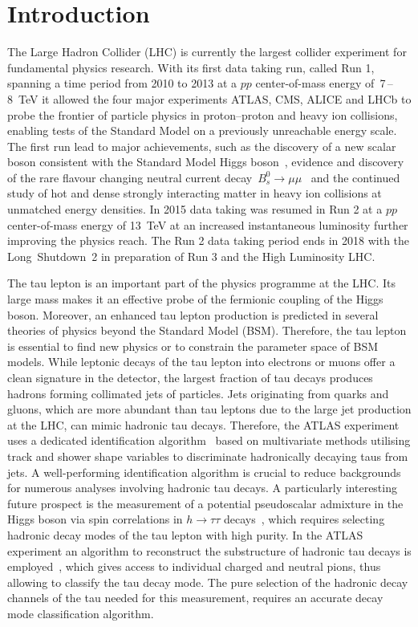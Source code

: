 \chapter*{Introduction}
\label{sec:intro}

The Large Hadron Collider (LHC) is currently the largest collider experiment for
fundamental physics research. With its first data taking run, called Run 1,
spanning a time period from 2010 to 2013 at a $pp$ center-of-mass energy
of~\num{7}\,--\,\SI{8}{\TeV} it allowed the four major experiments ATLAS, CMS,
ALICE and LHCb to probe the frontier of particle physics in proton--proton and
heavy ion collisions, enabling tests of the Standard Model on a previously
unreachable energy scale. The first run lead to major achievements, such as the
discovery of a new scalar boson consistent with the Standard Model Higgs
boson~\cite{higgs_atlas, higgs_cms}, evidence and discovery of the rare flavour
changing neutral current decay~$B_s^0 \to \mu \mu$~\cite{lhcb_bs_mumu,
  cms_bs_mumu} and the continued study of hot and dense strongly interacting
matter in heavy ion collisions at unmatched energy densities. In 2015 data
taking was resumed in Run 2 at a $pp$ center-of-mass energy of \SI{13}{\TeV} at
an increased instantaneous luminosity further improving the physics reach. The
Run 2 data taking period ends in 2018 with the Long~Shutdown~2 in preparation of
Run 3 and the High Luminosity LHC.

The tau lepton is an important part of the physics programme at the LHC. Its
large mass makes it an effective probe of the fermionic coupling of the Higgs
boson. Moreover, an enhanced tau lepton production is predicted in several
theories of physics beyond the Standard Model (BSM). Therefore, the tau lepton
is essential to find new physics or to constrain the parameter space of BSM
models. While leptonic decays of the tau lepton into electrons or muons offer a
clean signature in the detector, the largest fraction of tau decays produces
hadrons forming collimated jets of particles. Jets originating from quarks and
gluons, which are more abundant than tau leptons due to the large jet production
at the LHC, can mimic hadronic tau decays. Therefore, the ATLAS experiment uses
a dedicated identification algorithm~\cite{atlas:taurec:run1, atlas:taurec:run2}
based on multivariate methods utilising track and shower shape variables to
discriminate hadronically decaying taus from jets. A well-performing
identification algorithm is crucial to reduce backgrounds for numerous analyses
involving hadronic tau decays. A particularly interesting future prospect is the
measurement of a potential pseudoscalar admixture in the Higgs boson via spin
correlations in $h \to \tau\tau$ decays~\cite{desch_higgs_cp, harnik,
  Berge2014}, which requires selecting hadronic decay modes of the tau lepton
with high purity. In the ATLAS experiment an algorithm to reconstruct the
substructure of hadronic tau decays is employed~\cite{atlas:taurec:decaymodes},
which gives access to individual charged and neutral pions, thus allowing to
classify the tau decay mode. The pure selection of the hadronic decay channels
of the tau needed for this measurement, requires an accurate decay mode
classification algorithm.


